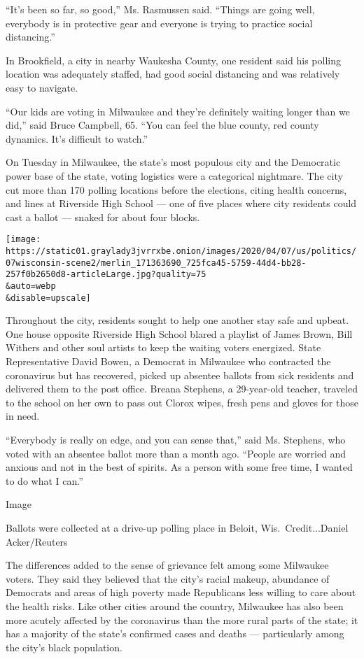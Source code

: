 ``It's been so far, so good,'' Ms. Rasmussen said. ``Things are going
well, everybody is in protective gear and everyone is trying to practice
social distancing.''

In Brookfield, a city in nearby Waukesha County, one resident said his
polling location was adequately staffed, had good social distancing and
was relatively easy to navigate.

``Our kids are voting in Milwaukee and they're definitely waiting longer
than we did,'' said Bruce Campbell, 65. ``You can feel the blue county,
red county dynamics. It's difficult to watch.''

On Tuesday in Milwaukee, the state's most populous city and the
Democratic power base of the state, voting logistics were a categorical
nightmare. The city cut more than 170 polling locations before the
elections, citing health concerns, and lines at Riverside High School
--- one of five places where city residents could cast a ballot ---
snaked for about four blocks.

\texttt{[image: https://static01.graylady3jvrrxbe.onion/images/2020/04/07/us/politics/07wisconsin-scene2/merlin\_171363690\_725fca45-5759-44d4-bb28-257f0b2650d8-articleLarge.jpg?quality=75\\\&auto=webp\\\&disable=upscale]}

Throughout the city, residents sought to help one another stay safe and
upbeat. One house opposite Riverside High School blared a playlist of
James Brown, Bill Withers and other soul artists to keep the waiting
voters energized. State Representative David Bowen, a Democrat in
Milwaukee who contracted the coronavirus but has recovered, picked up
absentee ballots from sick residents and delivered them to the post
office. Breana Stephens, a 29-year-old teacher, traveled to the school
on her own to pass out Clorox wipes, fresh pens and gloves for those in
need.

``Everybody is really on edge, and you can sense that,'' said Ms.
Stephens, who voted with an absentee ballot more than a month ago.
``People are worried and anxious and not in the best of spirits. As a
person with some free time, I wanted to do what I can.''

Image

Ballots were collected at a drive-up polling place in Beloit,
Wis.~Credit...Daniel Acker/Reuters

The differences added to the sense of grievance felt among some
Milwaukee voters. They said they believed that the city's racial makeup,
abundance of Democrats and areas of high poverty made Republicans less
willing to care about the health risks. Like other cities around the
country, Milwaukee has also been more acutely affected by the
coronavirus than the more rural parts of the state; it has a majority of
the state's confirmed cases and deaths --- particularly among the city's
black population.

